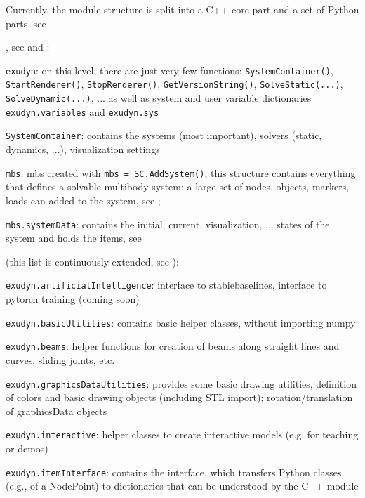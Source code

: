 Currently, the \codeName module structure is split into a C++ core part and a set of 
Python parts, see .
\bi
  \item {}, see  and :
  \bi
    \item[--] \texttt{exudyn}:
    on this level, there are just very few functions: \texttt{SystemContainer()}, \texttt{StartRenderer()}, \texttt{StopRenderer()}, \texttt{GetVersionString()}, \texttt{SolveStatic(...)}, \texttt{SolveDynamic(...)}, ... as well as system and user variable dictionaries \texttt{exudyn.variables} and \texttt{exudyn.sys}
    \item[--] \texttt{SystemContainer}: contains the systems (most important), solvers (static, dynamics, ...), visualization settings
    \item[--] \texttt{mbs}: \acf{mbs} created with \texttt{mbs = SC.AddSystem()}, this structure contains everything that defines a solvable multibody system; a large set of nodes, objects, markers, 
    loads can added to the system, see ;
    \item[--] \texttt{mbs.systemData}: contains the initial, current, visualization, ... states of the system and holds the items, see 
  \ei
  \item {} (this list is continuously extended, see ):
  \bi
    \item[--] \texttt{exudyn.artificialIntelligence}: interface to stablebaselines, interface to pytorch training (coming soon)
    \item[--] \texttt{exudyn.basicUtilities}: contains basic helper classes, without importing numpy
    \item[--] \texttt{exudyn.beams}: helper functions for creation of beams along straight lines and curves, sliding joints, etc.
    \item[--] \texttt{exudyn.graphicsDataUtilities}: provides some basic drawing utilities, definition of colors and basic drawing objects (including \acs{STL} import); rotation/translation of graphicsData objects
    \item[--] \texttt{exudyn.interactive}: helper classes to create interactive models (e.g. for teaching or demos)
    \item[--] \texttt{exudyn.itemInterface}: contains the interface, which transfers Python classes (e.g., of a NodePoint) to dictionaries that can be understood by the C++ module
